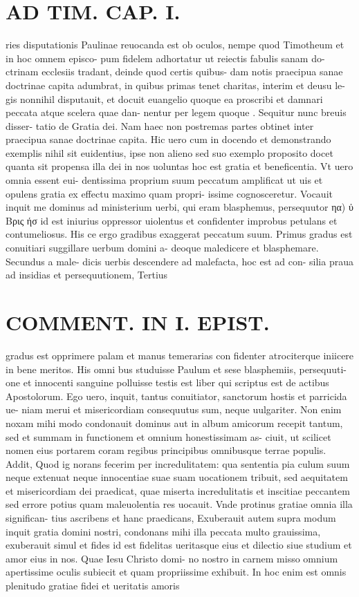 \documentclass{article}
\begin{document}
\begin{pages}
\section*{AD TIM. CAP. I. }
\marginpar{[ p.103 ]}\pstart ries disputationis Paulinae reuocanda est ob oculos, nempe quod Timotheum et in hoc omnem episco- pum fidelem adhortatur ut reiectis fabulis sanam do- ctrinam ecclesiis tradant, deinde quod certis quibus- dam notis praecipua sanae doctrinae capita adumbrat, in quibus primas tenet charitas, interim et deusu le- gis nonnihil disputauit, et docuit euangelio quoque ea proscribi et damnari peccata atque scelera quae dan- nentur per legem quoque . Sequitur nunc breuis disser- tatio de Gratia dei. Nam haec non postremas partes obtinet inter praecipua sanae doctrinae capita. Hic uero cum in docendo et demonstrando exemplis nihil sit euidentius, ipse non alieno sed suo exemplo proposito docet quanta sit propensa illa dei in nos uoluntas hoc est gratia et beneficentia. Vt uero omnia essent eui- dentissima proprium suum peccatum amplificat ut uis et opulens gratia ex effectu maximo quam propri- issime cognosceretur. Vocauit inquit me dominus ad ministerium uerbi, qui eram blasphemus, persequutor ηα) ὐ Βρις ήσ id est iniurius oppressor uiolentus et confidenter improbus petulans et contumeliosus. His ce ergo gradibus exaggerat peccatum suum. Primus gradus est conuitiari suggillare uerbum domini a- deoque maledicere et blasphemare. Secundus a male- dicis uerbis descendere ad malefacta, hoc est ad con- silia praua ad insidias et persequutionem, Tertius  \pend
\section*{COMMENT. IN I. EPIST. }\pstart gradus est opprimere palam et manus temerarias con fidenter atrociterque iniicere in bene meritos. His omni bus studuisse Paulum et sese blasphemiis, persequuti- one et innocenti sanguine polluisse testis est liber qui scriptus est de actibus Apostolorum. Ego uero, inquit, tantus conuitiator, sanctorum hostis et parricida ue- niam merui et misericordiam consequutus sum, neque  uulgariter. Non enim noxam mihi modo condonauit dominus aut in album amicorum recepit tantum, sed et summam in functionem et omnium honestissimam as- ciuit, ut scilicet nomen eius portarem coram regibus principibus omnibusque terrae populis. Addit, Quod ig norans fecerim per incredulitatem: qua sententia pia culum suum neque extenuat neque innocentiae suae suam uocationem tribuit, sed aequitatem et misericordiam dei praedicat, quae miserta incredulitatis et inscitiae peccantem sed errore potius quam maleuolentia res uocauit. Vnde protinus gratiae omnia illa significan- tius ascribens et hanc praedicans, Exuberauit autem supra modum inquit gratia domini nostri, condonans mihi illa peccata multo grauissima, exuberauit simul et fides id est fidelitas ueritasque eius et dilectio siue studium et amor eius in nos. Quae Iesu Christo domi- no nostro in carnem misso omnium apertissime oculis subiecit et quam propriissime exhibuit. In hoc enim est omnis plenitudo gratiae fidei et ueritatis amoris  \pend

\end{pages}
\end{document}
